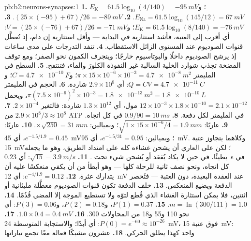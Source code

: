 \begin{solution}{pb:b2:neurons-synapses:1}
\textbf{1.} $E_{\mathrm K} = 61.5\log_{10}(4/140) = \qty{-95}{mV}$؛
و$E_{\mathrm{Na}} = 61.5\log_{10}(145/12) = \qty{+67}{mV}$.
\textbf{2.} $(25\times(-95) + 67)/26 = \qty{-89}{mV}$.
\textbf{3.} $E_{\mathrm K} = 61.5\log_{10}(8/140) = \qty{-76}{mV}$؛
و$V = (25\times(-76) + 67)/26 = \qty{-71}{mV}$: أي أقرب إلى العتبة،
فأشد استثارية في البداية --- وأقل استثارية إن دام، إذ تُعطَّل قنوات
الصوديوم عند المستوى الزائل الاستقطاب.
\textbf{4.} تنفد التدرجات على مدى ساعات إذ يرشح الصوديوم داخلًا
والبوتاسيوم خارجًا؛ وينجرف الكمون نحو الصفر؛ ومع توقف
المضخة تجذب شوارد الخلية السالبة غير النفوذة الكلورَ والماء،
فتنتفخ.
\textbf{5.} السطح في المليمتر $\pi\times 15\times 10^{-6}\times
10^{-3} = \qty{4.7e-8}{m^2}$؛ و$C = \qty{4.7e-10}{F}$؛ و$Q = CV =
\qty{4.7e-11}{C}$: أي $2.9\times 10^{8}$ شاردة.
\textbf{6.} الحجم في المليمتر $\pi(7.5\times 10^{-6})^{2}\times
10^{-3} = \qty{1.8e-13}{m^3} = \qty{1.8e-10}{L}$، ويحمل $12\times
10^{-3}\times 1.8\times 10^{-10} = 2.1\times 10^{-12}$ مول، أي $1.3\times
10^{12}$ شاردة: فالتغير $2\times 10^{-4}$.
\textbf{7.} $2.9\times 10^{8}/3 \approx 10^{8}$ من ATP في المليمتر لكل
دفعة.
\textbf{8.} $0.9/90 = \qty{10}{ms}$ في كل اتجاه.
\textbf{9.} عاريًا: $\sqrt{1\times 15\times 10^{-6}/4} = \qty{1.9}{mm}$؛
وبميالين: $\times\sqrt{250} = \qty{31}{mm}$.
\textbf{10.} عاريًا: $e^{-1.5/1.9} = 0.45$، أي \qty{45}{mV}؛ وبميالين:
$e^{-1.5/31} = 0.95$، أي \qty{95}{mV}. وكلاهما يتجاوز عتبة \qty{15}{mV}؛
لكن على  العاري أن يشحن غشاءه كله على امتداد
الطريق، وهو ما يجعله بطيئًا، في حين لا يكاد يُفقد أو يُشحن شيء
تحت .
\textbf{11.} $\sqrt{15} = \qty{3.9}{m/s}$: أي \qty{0.23}{s} في كل اتجاه،
ونحو نصف ثانية للرحلة كلها --- وهو أبطأ من أن يكفي منعكسًا
عليه أن يتدارك عثرة.
\textbf{12.} $e^{-4/1.9} = 0.12$: أي \qty{12}{mV} عند العقدة البعيدة، دون
العتبة --- فتُحصر الدفعة ويضيع المنعكس.
\textbf{13.} خلف الدفعة تكون قنوات الصوديوم معطَّلة
مليثانية أو اثنتين، فلا يمكن استثارة الغشاء الذي قُطع لتوّه
ولا تستطيع الموجة إلا المضي قُدُمًا.
\textbf{14.} $m = \ln(300/111) = 1.0$.
\textbf{15.} $P(1) = 0.37$، و$P(2) = 0.18$، و$P(3) = 0.06$: أي نحو 110 و55
و18 من المحاولات 300.
\textbf{16.} $1.0\times 0.4 = \qty{0.4}{mV}$.
\textbf{17.} $P(0) = e^{-60} \approx 10^{-26}$: أي أبدًا؛ والاستجابة المتوسطة
\qty{24}{mV}، فوق عتبة \qty{15}{mV}:  واحد كهذا
يطلق  الحركي.
\textbf{18.} عشرون مشبكًا فعالة معًا تجمع تياراتها

\end{solution}
